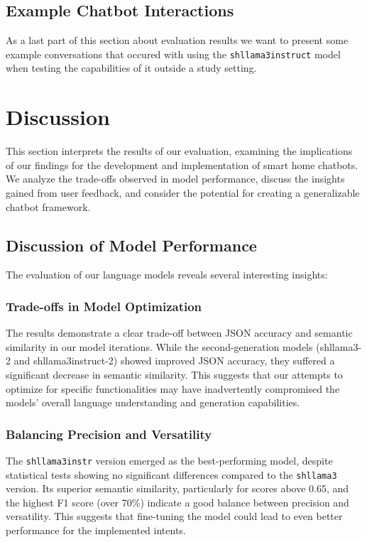 \subsection{Example Chatbot Interactions}
As a last part of this section about evaluation results we want to present some example conversations that occured with using the \texttt{shllama3instruct} model when testing the capabilities of it outside a study setting.





\section{Discussion}
This section interprets the results of our evaluation, examining the implications of our findings for the development and implementation of smart home chatbots. We analyze the trade-offs observed in model performance, discuss the insights gained from user feedback, and consider the potential for creating a generalizable chatbot framework. 

\subsection{Discussion of Model Performance}
The evaluation of our language models reveals several interesting insights:
\subsubsection{Trade-offs in Model Optimization}
The results demonstrate a clear trade-off between JSON accuracy and semantic similarity in our model iterations. While the second-generation models (shllama3-2 and shllama3instruct-2) showed improved JSON accuracy, they suffered a significant decrease in semantic similarity. This suggests that our attempts to optimize for specific functionalities may have inadvertently compromised the models' overall language understanding and generation capabilities.
\subsubsection{Balancing Precision and Versatility}
The \texttt{shllama3instr} version emerged as the best-performing model, despite statistical tests showing no significant differences compared to the \texttt{shllama3} version. Its superior semantic similarity, particularly for scores above 0.65, and the highest F1 score (over 70\%) indicate a good balance between precision and versatility. This suggests that fine-tuning the model could lead to even better performance for the implemented intents.


